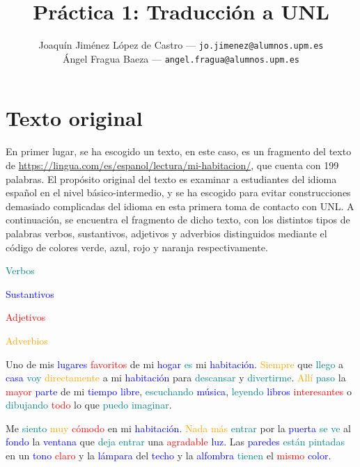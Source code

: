 \documentclass{article}
\title{Práctica 1: Traducción a UNL} %
\author{
        \normalsize Joaquín Jiménez López de Castro --- \small\texttt{jo.jimenez@alumnos.upm.es}\\
        \normalsize Ángel Fragua Baeza --- \small\texttt{angel.fragua@alumnos.upm.es}
}
\begin{document}
\maketitle

\thispagestyle{empty}

\newpage


\section{Texto original}

En primer lugar, se ha escogido un texto, en este caso, es un fragmento del texto de \url{https://lingua.com/es/espanol/lectura/mi-habitacion/}, que cuenta con 199 palabras. El propósito original del texto es examinar a estudiantes del idioma español en el nivel básico-intermedio, y se ha escogido para evitar construcciones demasiado complicadas del idioma en esta primera toma de contacto con UNL. A continuación, se encuentra el fragmento de dicho texto, con los distintos tipos de palabras verbos, sustantivos, adjetivos y adverbios distinguidos mediante el código de colores verde, azul, rojo y naranja respectivamente.

\textcolor{teal}{Verbos}

\textcolor{blue}{Sustantivos}

\textcolor{red}{Adjetivos}

\textcolor{orange}{Adverbios}

Uno de mis \textcolor{blue}{lugares} \textcolor{red}{favoritos} de mi \textcolor{blue}{hogar} \textcolor{teal}{es} mi \textcolor{blue}{habitación}. \textcolor{orange}{Siempre} que \textcolor{teal}{llego} a \textcolor{blue}{casa} \textcolor{teal}{voy} \textcolor{orange}{directamente} a mi \textcolor{blue}{habitación} para \textcolor{teal}{descansar} y \textcolor{teal}{divertirme}. \textcolor{orange}{Allí} \textcolor{teal}{paso} la \textcolor{red}{mayor} \textcolor{blue}{parte} de mi \textcolor{blue}{tiempo} \textcolor{blue}{libre}, \textcolor{teal}{escuchando} \textcolor{blue}{música}, \textcolor{teal}{leyendo} \textcolor{blue}{libros} \textcolor{red}{interesantes} o \textcolor{teal}{dibujando} \textcolor{red}{todo} lo que \textcolor{teal}{puedo imaginar}.

Me \textcolor{teal}{siento} \textcolor{orange}{muy} \textcolor{red}{cómodo} en mi \textcolor{blue}{habitación}. \textcolor{orange}{Nada más} \textcolor{teal}{entrar} por la \textcolor{blue}{puerta} \textcolor{teal}{se ve} al \textcolor{blue}{fondo} la \textcolor{blue}{ventana} que \textcolor{teal}{deja entrar} una \textcolor{red}{agradable} \textcolor{blue}{luz}. Las \textcolor{blue}{paredes} \textcolor{teal}{están} \textcolor{teal}{pintadas} en un \textcolor{blue}{tono} \textcolor{red}{claro} y la \textcolor{blue}{lámpara} del \textcolor{blue}{techo} y la \textcolor{blue}{alfombra} \textcolor{teal}{tienen} el \textcolor{red}{mismo} \textcolor{blue}{color}.
\end{document}
